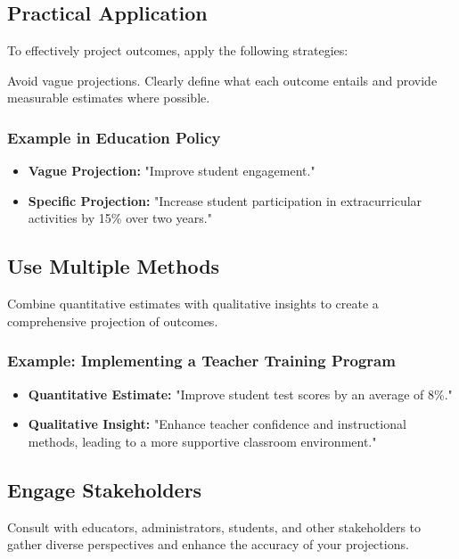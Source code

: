 \documentclass{article}
\theoremstyle{definition}
\theoremstyle{plain}
\begin{document}
\subsection{Practical Application}

To effectively project outcomes, apply the following strategies:

Avoid vague projections. Clearly define what each outcome entails and provide measurable estimates where possible.

\subsubsection{Example in Education Policy}

\begin{itemize}
    \item \textbf{Vague Projection:} "Improve student engagement."
    \item \textbf{Specific Projection:} "Increase student participation in extracurricular activities by 15\% over two years."
\end{itemize}

\subsection{Use Multiple Methods}

Combine quantitative estimates with qualitative insights to create a comprehensive projection of outcomes.

\subsubsection{Example: Implementing a Teacher Training Program}

\begin{itemize}
    \item \textbf{Quantitative Estimate:} "Improve student test scores by an average of 8\%."
    \item \textbf{Qualitative Insight:} "Enhance teacher confidence and instructional methods, leading to a more supportive classroom environment."
\end{itemize}

\subsection{Engage Stakeholders}

Consult with educators, administrators, students, and other stakeholders to gather diverse perspectives and enhance the accuracy of your projections.
\end{document}
